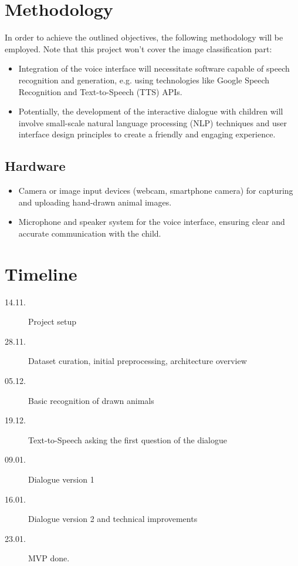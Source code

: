 \section{Methodology}
In order to achieve the outlined objectives, the following methodology will be employed. Note that this project won't cover the image classification part:
\begin{itemize}
  \item Integration of the voice interface will necessitate software capable of speech recognition and generation, e.g. using technologies like Google Speech Recognition and Text-to-Speech (TTS) APIs.
  \item Potentially, the development of the interactive dialogue with children will involve small-scale natural language processing (NLP) techniques and user interface design principles to create a friendly and engaging experience.
\end{itemize}
\subsection{Hardware}
\begin{itemize}
  \item Camera or image input devices (webcam, smartphone camera) for capturing and uploading hand-drawn animal images.
  \item Microphone and speaker system for the voice interface, ensuring clear and accurate communication with the child.
\end{itemize}

\section{Timeline}
\begin{description}
\item[14.11.] Project setup
\item[28.11.] Dataset curation, initial preprocessing, architecture overview
\item[05.12.] Basic recognition of drawn animals
\item[19.12.] Text-to-Speech asking the first question of the dialogue
\item[09.01.] Dialogue version 1
\item[16.01.] Dialogue version 2 and technical improvements
\item[23.01.] MVP done.
\end{description}


